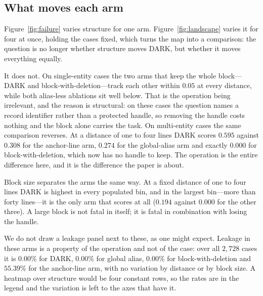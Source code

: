 \subsection{What moves each arm}
\label{sec:landscape}

Figure~\ref{fig:failure} varies structure for one arm. Figure~\ref{fig:landscape} varies it for
four at once, holding the cases fixed, which turns the map into a comparison: the question is no
longer whether structure moves \textsc{DARK}, but whether it moves everything equally.

It does not. On single-entity cases the two arms that keep the whole block---\textsc{DARK} and
block-with-deletion---track each other within $0.05$ at every distance, while both alias-less
ablations sit well below. That is the operation being irrelevant, and the reason is structural: on
these cases the question names a record identifier rather than a protected handle, so removing the
handle costs nothing and the block alone carries the task. On multi-entity cases the same
comparison reverses. At a distance of one to four lines \textsc{DARK} scores $0.595$ against
$0.308$ for the anchor-line arm, $0.274$ for the global-alias arm and exactly $0.000$ for
block-with-deletion, which now has no handle to keep. The operation is the entire difference here,
and it is the difference the paper is about.

Block size separates the arms the same way. At a fixed distance of one to four lines
\textsc{DARK} is highest in every populated bin, and in the largest bin---more than forty
lines---it is the only arm that scores at all ($0.194$ against $0.000$ for the other three).
A large block is not fatal in itself; it is fatal in combination with losing the handle.

We do not draw a leakage panel next to these, as one might expect. Leakage in these arms is a
property of the operation and not of the case: over all $2{,}728$ cases it is $0.00\%$ for
\textsc{DARK}, $0.00\%$ for global alias, $0.00\%$ for block-with-deletion and $55.39\%$ for the
anchor-line arm, with no variation by distance or by block size. A heatmap over structure would be
four constant rows, so the rates are in the legend and the variation is left to the axes that
have it.

